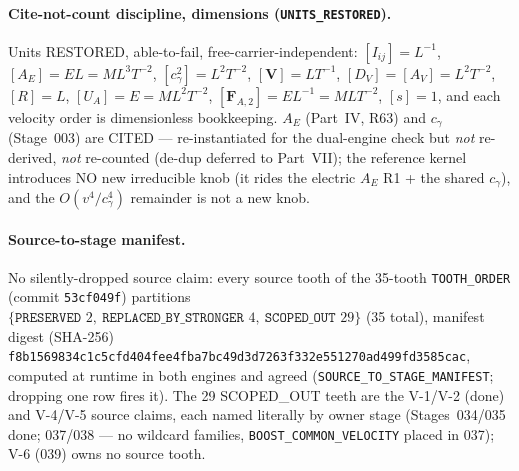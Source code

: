 \paragraph{Cite-not-count discipline, dimensions (\texttt{UNITS\_RESTORED}).}
Units RESTORED, able-to-fail, free-carrier-independent: \([I_{ij}]=L^{-1}\),
\([A_E]=EL=ML^3T^{-2}\), \([c_\gamma^2]=L^2T^{-2}\), \([\mathbf V]=LT^{-1}\),
\([D_V]=[A_V]=L^2T^{-2}\), \([R]=L\), \([U_A]=E=ML^2T^{-2}\),
\([\mathbf F_{A,2}]=EL^{-1}=MLT^{-2}\), \([s]=1\), and each velocity order is
dimensionless bookkeeping. \(A_E\) (Part~IV, R63) and \(c_\gamma\) (Stage~003) are
CITED --- re-instantiated for the dual-engine check but \emph{not} re-derived,
\emph{not} re-counted (de-dup deferred to Part~VII); the reference kernel introduces
NO new irreducible knob (it rides the electric \(A_E\) R1 + the shared
\(c_\gamma\)), and the \(O(v^4/c_\gamma^4)\) remainder is not a new knob.

\paragraph{Source-to-stage manifest.}
No silently-dropped source claim: every source tooth of the 35-tooth
\texttt{TOOTH\_ORDER} (commit \texttt{53cf049f}) partitions
\(\{\texttt{PRESERVED }2,\ \texttt{REPLACED\_BY\_STRONGER }4,\ \texttt{SCOPED\_OUT }29\}\)
(35 total), manifest digest (SHA-256)
\texttt{f8b1569834c1c5cfd404fee4fba7bc49d3d7263f332e551270ad499fd3585cac},
computed at runtime in both engines and agreed
(\texttt{SOURCE\_TO\_STAGE\_MANIFEST}; dropping one row fires it). The 29
SCOPED\_OUT teeth are the V-1/V-2 (done) and V-4/V-5 source claims, each named
literally by owner stage (Stages~034/035 done; 037/038 --- no wildcard families,
\texttt{BOOST\_COMMON\_VELOCITY} placed in 037); V-6 (039) owns no source tooth.

